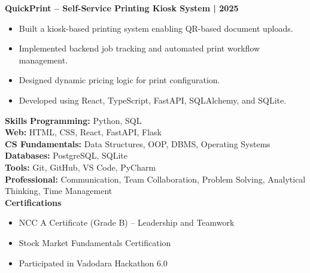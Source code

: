 \documentclass[10pt]{article}
\begin{document}
\textbf{QuickPrint – Self-Service Printing Kiosk System | 2025}
\begin{itemize}
\item Built a kiosk-based printing system enabling QR-based document uploads.
\item Implemented backend job tracking and automated print workflow management.
\item Designed dynamic pricing logic for print configuration.
\item Developed using React, TypeScript, FastAPI, SQLAlchemy, and SQLite.
\end{itemize}

\textbf{Skills}
\textbf{Programming:} Python, SQL\\
\textbf{Web:} HTML, CSS, React, FastAPI, Flask\\
\textbf{CS Fundamentals:} Data Structures, OOP, DBMS, Operating Systems\\
\textbf{Databases:} PostgreSQL, SQLite\\
\textbf{Tools:} Git, GitHub, VS Code, PyCharm\\
\textbf{Professional:} Communication, Team Collaboration, Problem Solving, Analytical Thinking, Time Management\\

\textbf{Certifications}
\begin{itemize}
\item NCC A Certificate (Grade B) – Leadership and Teamwork
\item Stock Market Fundamentals Certification
\item Participated in Vadodara Hackathon 6.0
\end{itemize}
\end{document}
